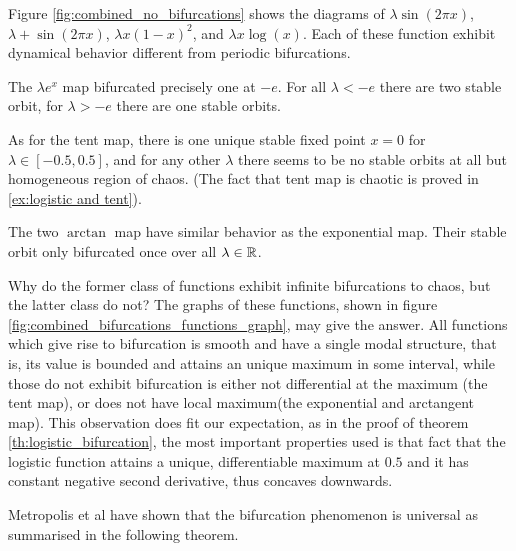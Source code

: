 Figure \ref{fig:combined_no_bifurcations} shows the diagrams of $\lambda \sin(2\pi x)$, $\lambda + \sin(2\pi x)$, $\lambda x(1-x)^2$, and $\lambda x \log(x)$. 
Each of these function exhibit dynamical behavior different from periodic bifurcations.

The $\lambda e^x$ map bifurcated precisely one at $-e$. 
For all $\lambda < -e$ there are two stable orbit, for $\lambda > -e$ there are one stable orbits.

As for the tent map, there is one unique stable fixed point $x=0$ for $\lambda \in [-0.5, 0.5]$, and for any other $\lambda$ there seems to be no stable orbits at all but homogeneous region of chaos. 
(The fact that tent map is chaotic is proved in \ref{ex:logistic and tent}).

The two $\arctan$ map have similar behavior as the exponential map. 
Their stable orbit only bifurcated once over all $\lambda \in \mathbb{R}$.

Why do the former class of functions exhibit infinite bifurcations to chaos, but the latter class do not?
The graphs of these functions, shown in figure \ref{fig:combined_bifurcations_functions_graph}, may give the answer. 
All functions which give rise to bifurcation is smooth and have a single modal structure, that is, its value is bounded and attains an unique maximum in some interval, while those do not exhibit bifurcation is either not differential at the maximum (the tent map), or does not have local maximum(the exponential and arctangent map).
This observation does fit our expectation, as in the proof of theorem \ref{th:logistic_bifurcation}, the most important properties used is that fact that the logistic function attains a unique, differentiable maximum at $0.5$ and it has constant negative second derivative, thus concaves downwards. 

Metropolis et al \cite{metropolis2017finite} have shown that the bifurcation phenomenon is universal as summarised in the following theorem.


